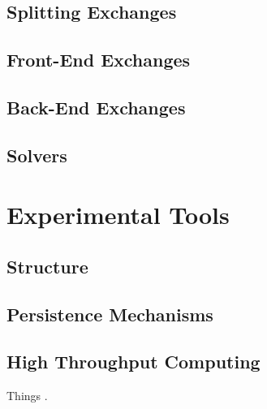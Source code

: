 \subsection{Splitting Exchanges}\label{method:setup:split}

\subsection{Front-End Exchanges}\label{method:setup:front}

\subsection{Back-End Exchanges}\label{method:setup:back}

\subsection{Solvers}\label{method:setup:solve}

\section{Experimental Tools}\label{method:tools}

\subsection{Structure}\label{method:tools:struc}

\subsection{Persistence Mechanisms}\label{method:tools:hdf5}

\subsection{High Throughput Computing}\label{method:tools:htc}

Things \cite{bui_work_2011}.
